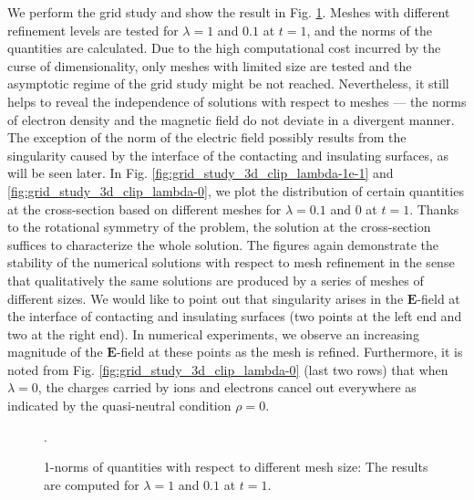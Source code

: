 \documentclass{article}
\begin{document}
We perform the grid study and show the result in Fig. \ref{fig:grid_study_3d}. Meshes with different refinement levels are tested for $\lambda = 1$ and $0.1$ at $t = 1$, and the norms of the quantities are calculated. Due to the high computational cost incurred by the curse of dimensionality, only meshes with limited size are tested and the asymptotic regime of the grid study might be not reached. Nevertheless, it still helps to reveal the independence of solutions with respect to meshes --- the norms of electron density and the magnetic field do not deviate in a divergent manner. The exception of the norm of the electric field possibly results from the singularity caused by the interface of the contacting and insulating surfaces, as will be seen later. 
In Fig. \ref{fig:grid_study_3d_clip_lambda-1e-1} and \ref{fig:grid_study_3d_clip_lambda-0}, we plot the distribution of certain quantities at the cross-section based on different meshes for $\lambda = 0.1$ and $0$ at $t = 1$. Thanks to the rotational symmetry of the problem, the solution at the cross-section suffices to characterize the whole solution. The figures again demonstrate the stability of the numerical solutions with respect to mesh refinement in the sense that qualitatively the same solutions are produced by a series of meshes of different sizes. We would like to point out that singularity arises in the $\mathbf{E}$-field at the interface of contacting and insulating surfaces (two points at the left end and two at the right end). In numerical experiments, we observe an increasing magnitude of the $\mathbf{E}$-field at these points as the mesh is refined. Furthermore, it is noted from Fig. \ref{fig:grid_study_3d_clip_lambda-0} (last two rows) that when $\lambda = 0$, the charges carried by ions and electrons cancel out everywhere as indicated by the quasi-neutral condition $\rho = 0$.

\begin{figure}
    \centering
    \caption{1-norms of quantities with respect to different mesh size: The results are computed for $\lambda = 1$ and $0.1$ at $t = 1$.}.
    \label{fig:grid_study_3d}
\end{figure}
\end{document}
